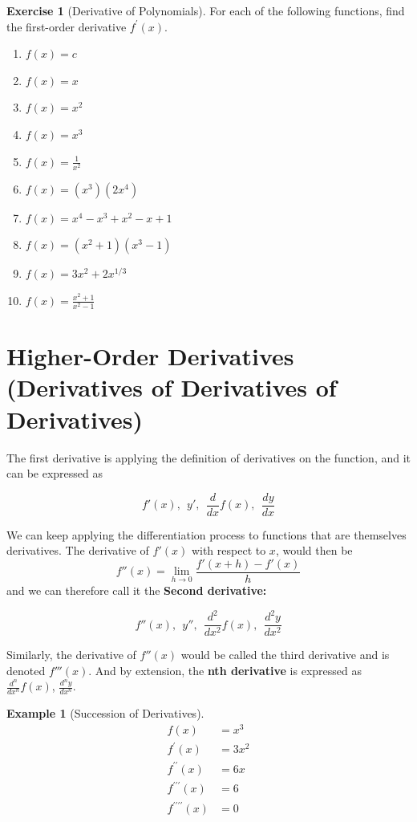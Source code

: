 \documentclass[
]{book}
\providecommand{\tightlist}{%
  \setlength{\itemsep}{0pt}\setlength{\parskip}{0pt}}
\theoremstyle{definition}
\theoremstyle{definition}
\newtheorem{example}{Example}[chapter]
\theoremstyle{definition}
\newtheorem{exercise}{Exercise}[chapter]
\theoremstyle{definition}
\theoremstyle{remark}
\begin{document}
\begin{exercise}[Derivative of Polynomials]
\protect\hypertarget{exr:introderivatives}{}{\label{exr:introderivatives} {} }
For each of the following functions, find the first-order derivative \(f^\prime(x)\).

\begin{enumerate}
\def\labelenumi{\arabic{enumi}.}
\tightlist
\item
  \(f(x)=c\)
\item
  \(f(x)=x\)
\item
  \(f(x)=x^2\)
\item
  \(f(x)=x^3\)
\item
  \(f(x)=\frac{1}{x^2}\)
\item
  \(f(x)=(x^3)(2x^4)\)
\item
  \(f(x) = x^4 - x^3 + x^2 - x + 1\)
\item
  \(f(x) = (x^2 + 1)(x^3 - 1)\)
\item
  \(f(x) = 3x^2 + 2x^{1/3}\)
\item
  \(f(x)=\frac{x^2+1}{x^2-1}\)
\end{enumerate}
\end{exercise}

\hypertarget{derivpoly}{%
\section{Higher-Order Derivatives (Derivatives of Derivatives of Derivatives)}\label{derivpoly}}

The first derivative is applying the definition of derivatives on the function, and it can be expressed as

\[f'(x),  ~~ y',  ~~ \frac{d}{dx}f(x), ~~ \frac{dy}{dx}\]

We can keep applying the differentiation process to functions that are themselves derivatives. The derivative of \(f'(x)\) with respect to \(x\), would then be \[f''(x)=\lim\limits_{h\to 0}\frac{f'(x+h)-f'(x)}{h}\] and we can therefore call it the \textbf{Second derivative:}

\[f''(x), ~~ y'', ~~ \frac{d^2}{dx^2}f(x), ~~ \frac{d^2y}{dx^2}\]

Similarly, the derivative of \(f''(x)\) would be called the third derivative and is denoted \(f'''(x)\). And by extension, the \textbf{nth derivative} is expressed as \(\frac{d^n}{dx^n}f(x)\), \(\frac{d^ny}{dx^n}\).

\begin{example}[Succession of Derivatives]
\protect\hypertarget{exm:unnamed-chunk-203}{}{\label{exm:unnamed-chunk-203} {} }\begin{align*}
f(x) &=x^3\\
f^{\prime}(x) &=3x^2\\
f^{\prime\prime}(x) &=6x \\
f^{\prime\prime\prime}(x) &=6\\
f^{\prime\prime\prime\prime}(x) &=0\\
\end{align*}
\end{example}
\end{document}
